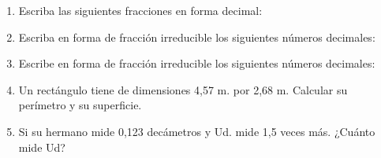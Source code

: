 \documentclass[twoside]{article}
\begin{document}
\begin{enumerate}
\item Escriba las siguientes fracciones en forma decimal:
\begin{enumerate}
\end{enumerate}
\item Escriba en forma de fracción irreducible los siguientes números decimales:
\begin{enumerate}
\end{enumerate}
\item Escribe en forma de fracción irreducible los siguientes números decimales:
\begin{enumerate}
\end{enumerate}
\item Un rectángulo tiene de dimensiones 4,57 m. por 2,68 m. Calcular su perímetro y su superficie.
\item Si su hermano mide 0,123 decámetros y Ud. mide 1,5 veces más. ¿Cuánto mide Ud?
\end{enumerate}
\end{document}
